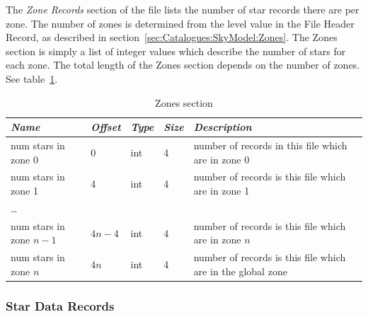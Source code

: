 The \emph{Zone Records} section of the file lists the number of star
records there are per zone. The number of zones is determined from the
level value in the File Header Record, as described in
section~\ref{sec:Catalogues:SkyModel:Zones}. The Zones section is
simply a list of integer values which describe the number of stars for
each zone. The total length of the Zones section depends on the number
of zones. See table~\ref{tab:Catalogues:stars:record:zones}.

\begin{table}[htbp]
\begin{tabularx}{\textwidth}{llllX}\toprule
\emph{Name} & \emph{Offset} & \emph{Type} & \emph{Size} &\emph{Description}\\\midrule
num stars in zone 0     & 0      & int & 4 &  number of records in this file which are in zone 0\\
num stars in zone 1     & 4      & int & 4 &  number of records is this file which are in zone 1\\
\ldots                  &        &     &   &\\
num stars in zone $n-1$ & $4n-4$ & int & 4 &  number of records is this file which are in zone $n$\\\bottomrule
num stars in zone $n$   & $4n$   & int & 4 &  number of records is this file which are in the global zone\\\bottomrule
\end{tabularx}
\caption{Zones section}
\label{tab:Catalogues:stars:record:zones}
\end{table}



\subsubsection{Star Data Records}%
\label{sec:Catalogues:stars:record:data}


